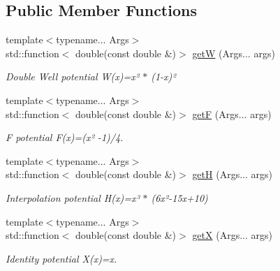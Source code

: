 \subsection*{Public Member Functions}
\begin{DoxyCompactItemize}
\item 
{\footnotesize template$<$typename... Args$>$ }\\std\+::function$<$ double(const double \&)$>$ \hyperlink{structpotential__function_3_010_00_01ThermodynamicsPotentialDiscretization_1_1Explicit_01_4_aad1f4c29167d929c6da7b701539a40b0}{getW} (Args... args)
\begin{DoxyCompactList}\small\item\em Double Well potential W(x)=x² $\ast$ (1-\/x)² \end{DoxyCompactList}\item 
{\footnotesize template$<$typename... Args$>$ }\\std\+::function$<$ double(const double \&)$>$ \hyperlink{structpotential__function_3_010_00_01ThermodynamicsPotentialDiscretization_1_1Explicit_01_4_ac2cb58d964d6727a364a8f7a39f57f93}{getF} (Args... args)
\begin{DoxyCompactList}\small\item\em F potential F(x)=(x² -\/1)/4. \end{DoxyCompactList}\item 
{\footnotesize template$<$typename... Args$>$ }\\std\+::function$<$ double(const double \&)$>$ \hyperlink{structpotential__function_3_010_00_01ThermodynamicsPotentialDiscretization_1_1Explicit_01_4_a61efe16deb68d2a92e1e160fc71240b9}{getH} (Args... args)
\begin{DoxyCompactList}\small\item\em Interpolation potential H(x)=x³ $\ast$ (6x²-\/15x+10) \end{DoxyCompactList}\item 
{\footnotesize template$<$typename... Args$>$ }\\std\+::function$<$ double(const double \&)$>$ \hyperlink{structpotential__function_3_010_00_01ThermodynamicsPotentialDiscretization_1_1Explicit_01_4_a47e7aead8ac26c18694091e060c480e9}{getX} (Args... args)
\begin{DoxyCompactList}\small\item\em Identity potential X(x)=x. \end{DoxyCompactList}\end{DoxyCompactItemize}


